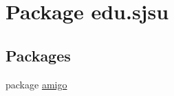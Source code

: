 \hypertarget{namespaceedu_1_1sjsu}{}\section{Package edu.\+sjsu}
\label{namespaceedu_1_1sjsu}
\subsection*{Packages}
\begin{DoxyCompactItemize}
\item 
package \hyperlink{namespaceedu_1_1sjsu_1_1amigo}{amigo}
\end{DoxyCompactItemize}

